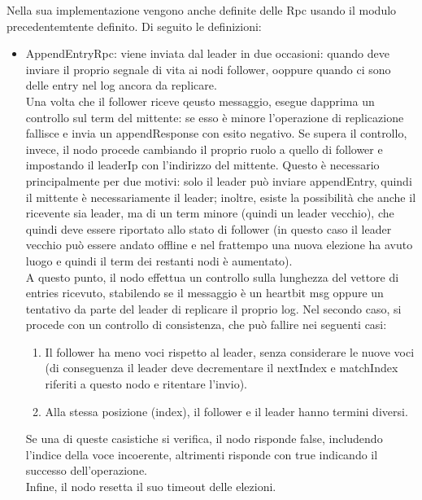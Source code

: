 Nella sua implementazione vengono anche definite delle Rpc usando il modulo precedentemtente 
definito. Di seguito le definizioni:

\begin{itemize}
  \item AppendEntryRpc: viene inviata dal leader in due occasioni: quando deve inviare il proprio segnale di vita ai 
    nodi follower, ooppure quando ci sono delle entry nel log ancora da replicare. \\
    Una volta che il follower riceve qeusto messaggio, esegue dapprima un controllo sul term del mittente: se esso è minore l'operazione
    di replicazione fallisce e invia un appendResponse con esito negativo. Se supera il controllo, invece, il nodo 
    procede cambiando il proprio ruolo a quello di follower e impostando il leaderIp con l'indirizzo del mittente. Questo 
    è necessario principalmente per due motivi: solo il leader può inviare appendEntry, quindi il mittente è necessariamente il leader;
    inoltre, esiste la possibilità che anche il ricevente sia leader, ma di un term minore (quindi un leader vecchio), che
    quindi deve essere riportato allo stato di follower (in questo caso il leader vecchio può essere andato offline e 
    nel frattempo una nuova elezione ha avuto luogo e quindi il term dei restanti nodi è aumentato). \\
    A questo punto, il nodo effettua un controllo sulla lunghezza del vettore di entries ricevuto, stabilendo 
    se il messaggio è un heartbit msg oppure un tentativo da parte del leader di replicare il proprio
    log. Nel secondo caso, si procede con un controllo di consistenza, che può fallire nei seguenti casi:
    \begin{enumerate}
      \item Il follower ha meno voci rispetto al leader, senza considerare le nuove voci 
        (di conseguenza il leader deve decrementare il nextIndex e matchIndex riferiti a questo nodo e ritentare l'invio).
      \item Alla stessa posizione (index), il follower e il leader hanno termini diversi.
    \end{enumerate} 
    Se una di queste casistiche si verifica, il nodo risponde false, includendo l'indice della voce incoerente, altrimenti
    risponde con true indicando il successo dell'operazione. \\
    Infine, il nodo resetta il suo timeout delle elezioni.


\end{itemize}
